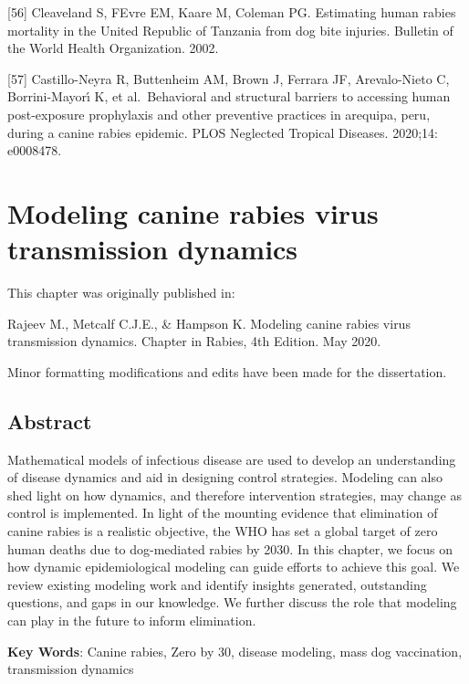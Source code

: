 \documentclass[
]{book}
\begin{document}
{[}56{]} Cleaveland S, FEvre EM, Kaare M, Coleman PG. Estimating human
rabies mortality in the United Republic of Tanzania from dog bite
injuries. Bulletin of the World Health Organization. 2002.

{[}57{]} Castillo-Neyra R, Buttenheim AM, Brown J, Ferrara JF, Arevalo-Nieto
C, Borrini-Mayorı́ K, et al.~Behavioral and structural barriers to
accessing human post-exposure prophylaxis and other preventive practices
in arequipa, peru, during a canine rabies epidemic. PLOS Neglected
Tropical Diseases. 2020;14: e0008478.

\hypertarget{modeling-canine-rabies-virus-transmission-dynamics}{%
\chapter{Modeling canine rabies virus transmission dynamics}\label{modeling-canine-rabies-virus-transmission-dynamics}}

This chapter was originally published in:

Rajeev M., Metcalf C.J.E., \& Hampson K. Modeling canine rabies virus transmission dynamics. Chapter in Rabies, 4th Edition. May 2020.

Minor formatting modifications and edits have been made for the dissertation.

\hypertarget{abstract-2}{%
\section*{Abstract}\label{abstract-2}}

Mathematical models of infectious disease are used to develop an
understanding of disease dynamics and aid in designing control
strategies. Modeling can also shed light on how dynamics, and therefore
intervention strategies, may change as control is implemented. In light
of the mounting evidence that elimination of canine rabies is a
realistic objective, the WHO has set a global target of zero human
deaths due to dog-mediated rabies by 2030. In this chapter, we focus on
how dynamic epidemiological modeling can guide efforts to achieve this
goal. We review existing modeling work and identify insights generated,
outstanding questions, and gaps in our knowledge. We further discuss the
role that modeling can play in the future to inform elimination.

\textbf{Key Words}: Canine rabies, Zero by 30, disease modeling, mass dog
vaccination, transmission dynamics
\end{document}
